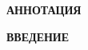 \newpage
\begin{center}
  \textbf{\large АННОТАЦИЯ}
\end{center}

\onehalfspacing
\setcounter{page}{2}

\newpage \renewcommand{\contentsname}{\centerline{\large СОДЕРЖАНИЕ}}
\tableofcontents

\newpage
\begin{center}
  \textbf{\large ВВЕДЕНИЕ}
\end{center}
